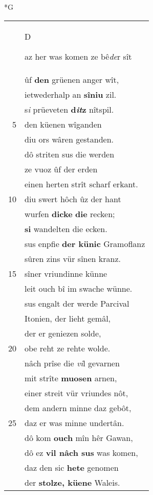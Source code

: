 \documentclass[8pt,a4paper,notitlepage]{article}
\begin{document}
\begin{table}[ht]
\begin{minipage}[t]{0.5\linewidth}
\small
\begin{center}*G
\end{center}
\begin{tabular}{rl}
 & \begin{large}D\end{large}az her was komen ze bê\textit{de}r sît\\ 
 & ûf \textbf{den} grüenen anger wît,\\ 
 & ietwederhalp an \textbf{sîniu} zil.\\ 
 & s\textit{i} prüeveten \textbf{d\textit{it}z} nîtspil.\\ 
5 & den küenen wîganden\\ 
 & diu ors wâren gestanden.\\ 
 & dô striten sus die werden\\ 
 & ze vuoz ûf der erden\\ 
 & einen herten strît scharf erkant.\\ 
10 & diu swert hôch ûz der hant\\ 
 & wurfen \textbf{dicke} \textbf{die} recken;\\ 
 & \textbf{si} wandelten die ecken.\\ 
 & sus enpfie \textbf{der künic} Gramoflanz\\ 
 & sûren zins vür sînen kranz.\\ 
15 & sîner vriundinne künne\\ 
 & leit ouch bî im swache wünne.\\ 
 & sus engalt der werde Parcival\\ 
 & Itonien, der lieht gemâl,\\ 
 & der er geniezen solde,\\ 
20 & obe reht ze rehte wolde.\\ 
 & nâch prîse die \textit{vi}l gevarnen\\ 
 & mit strîte \textbf{muosen} arnen,\\ 
 & einer streit vür vriundes nôt,\\ 
 & dem andern minne daz gebôt,\\ 
25 & daz er was minne undertân.\\ 
 & dô kom \textbf{ouch} mîn hêr Gawan,\\ 
 & dô ez \textbf{vil nâch sus} was komen,\\ 
 & daz den sic \textbf{hete} genomen\\ 
 & der \textbf{stolze, küene} Waleis.\\ 

\end{tabular}
\end{minipage}
\end{table}
\end{document}
